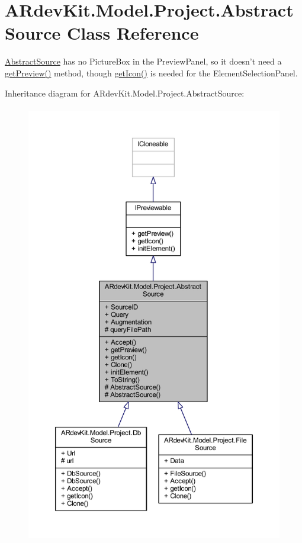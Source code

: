 \hypertarget{class_a_rdev_kit_1_1_model_1_1_project_1_1_abstract_source}{\section{A\-Rdev\-Kit.\-Model.\-Project.\-Abstract\-Source Class Reference}
\label{class_a_rdev_kit_1_1_model_1_1_project_1_1_abstract_source}
}


\hyperlink{class_a_rdev_kit_1_1_model_1_1_project_1_1_abstract_source}{Abstract\-Source} has no Picture\-Box in the Preview\-Panel, so it doesn't need a \hyperlink{class_a_rdev_kit_1_1_model_1_1_project_1_1_abstract_source_abd9f742efb27a1fca992f6627c0421e4}{get\-Preview()} method, though \hyperlink{class_a_rdev_kit_1_1_model_1_1_project_1_1_abstract_source_ae698f1c9d55cc0603931bd2804d0c35d}{get\-Icon()} is needed for the Element\-Selection\-Panel.  




Inheritance diagram for A\-Rdev\-Kit.\-Model.\-Project.\-Abstract\-Source\-:
\nopagebreak
\begin{figure}[H]
\begin{center}
\leavevmode
\includegraphics[height=550pt]{class_a_rdev_kit_1_1_model_1_1_project_1_1_abstract_source__inherit__graph}
\end{center}
\end{figure}


